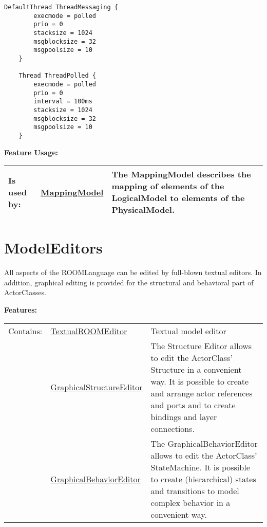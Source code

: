 	\begin{lstlisting}[language=etPhys]
	DefaultThread ThreadMessaging {
		execmode = polled
		prio = 0
		stacksize = 1024
		msgblocksize = 32
		msgpoolsize = 10
	}
	
	Thread ThreadPolled {
		execmode = polled
		prio = 0
		interval = 100ms
		stacksize = 1024
		msgblocksize = 32
		msgpoolsize = 10
	}
	\end{lstlisting}
		
		
		
	\begingroup
	\textbf{Feature Usage:}
	\renewcommand{\arraystretch}{1.8} %
	\begin{longtable}{l|l p{}}
		\hline
	Is used by: & \tabitem \hyperlink{ref:MappingModel}{MappingModel}  & The MappingModel describes the mapping of elements of the LogicalModel to elements of the PhysicalModel.\\
	\hline
	\end{longtable}
	\endgroup
		
	
	\vspace{\baselineskip}
	\vspace{\baselineskip}
	\vspace{\baselineskip}
	
\section{ModelEditors}
	\hypertarget{ref:ModelEditors}{}
	All aspects of the ROOMLanguage can be edited by full-blown textual editors. In addition, graphical editing is provided for the structural and behavioral part of ActorClasses.
	
	
	\begingroup
	\textbf{Features:}
	\renewcommand{\arraystretch}{1.8} %
	\begin{longtable}{l|l p{}}
		\hline
	Contains: & \tabitem \hyperlink{ref:TextualROOMEditor}{TextualROOMEditor}  & Textual model editor\\
	& \tabitem \hyperlink{ref:GraphicalStructureEditor}{GraphicalStructureEditor}  & The Structure Editor allows to edit the ActorClass' Structure in a convenient way. It is possible to create and arrange actor references and ports and to create bindings and layer connections. \\
	& \tabitem \hyperlink{ref:GraphicalBehaviorEditor}{GraphicalBehaviorEditor}  & The GraphicalBehaviorEditor allows to edit the ActorClass' StateMachine. It is possible to create (hierarchical) states and transitions to model complex behavior in a convenient way. \\
	\hline
	\end{longtable}
	\endgroup
	

